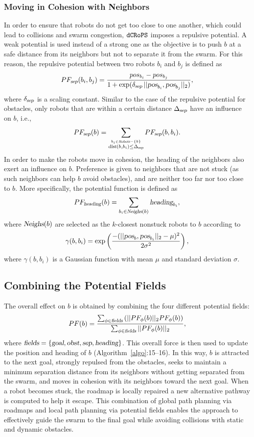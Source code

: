 \documentclass[letterpaper, 10pt, conference]{ieeeconf}
\newcommand{\Acronym}[1]{\ensuremath{{\small{\texttt{#1}}}}}
\newcommand{\Var}[1]{\ensuremath{{\small{\textsl{#1}}}}}
\newcommand{\Name}{\Acronym{dCRoPS}}
\begin{document}
\subsubsection{Moving in Cohesion with Neighbors}

In order to ensure that robots do not get too close to one another,
which could lead to collisions and swarm congestion, $\Name$ imposes a
repulsive potential. A weak potential is used instead of a strong one
as the objective is to push $b$ at a safe distance from its neighbors
but not to separate it from the swarm. For this reason, the repulsive
potential between two robots $b_i$ and $b_j$ is defined as
$$
PF_\Var{sep}(b_i, b_j) = \frac{pos_{b_i}-pos_{b_j}}{1 +
  \exp(\delta_\Var{sep}\, ||\Var{pos}_{b_i}, \Var{pos}_{b_j}||_2)},
$$
where $\delta_\Var{sep}$ is a scaling constant. Similar to the case of
the repulsive potential for obstacles, only robots that are within a
certain distance $\Delta_\Var{sep}$ have an influence on $b$, i.e.,
$$
PF_\Var{sep}(b) = \sum_{\stackrel{b_i \in
    \Var{Robots} - \{b\}}{\Var{dist}(b, b_i) \leq \Delta_\Var{sep}}}  PF_\Var{sep}(b, b_i).
$$
In order to make the robots move in cohesion, the heading of the neighbors also exert an
influence on $b$. Preference is given to neighbors that
are not stuck (as such neighbors can help $b$ avoid
obstacles), and are neither too far nor too close to $b$.
More specifically, the potential function is defined as
$$
PF_\Var{heading}(b) = \sum_{b_i \in
    \Var{Neighs}(b)} \Var{heading}_{b_i},
$$
where $\Var{Neighs}(b)$ are selected as the $k$-closest nonstuck
robots to $b$ according to 
$$
\gamma(b, b_i) = \exp\left(\frac{-(||\Var{pos}_b, \Var{pos}_{b_i}||_2 - \mu)^2}
{2\sigma^2}\right),
$$
where $\gamma(b, b_i)$ is a Gaussian function with mean $\mu$ and
standard deviation $\sigma$.

\subsection{Combining the Potential Fields}
The overall effect on $b$ is obtained by combining the four different
potential fields: 
$$
PF(b) = \frac{\sum_{\phi \in \Var{fields}} \left(|| PF_\phi(b)||_2
  PF_\phi(b)\right)}{\sum_{\phi \in \Var{fields}} || PF_\phi(b)||_2},
$$
where $\Var{fields} = \{\Var{goal}, \Var{obst}, \Var{sep}, 
\Var{heading}\}$. This overall force is then used to update the
position and heading of $b$ (Algorithm~\ref{algo}:15--16).
In this way, $b$ is attracted to the next goal, strongly repulsed from
the obstacles, seeks to maintain a minimum separation distance from
its neighbors without getting separated from the swarm, and moves in
cohesion with its neighbors toward the next goal. When a robot becomes
stuck, the roadmap is locally repaired a new alternative pathway is
computed to help it escape. This combination of global path planning
via roadmaps and local path planning via potential fields enables the
approach to effectively guide the swarm to the final goal while
avoiding collisions with static and dynamic obstacles. 
\end{document}
